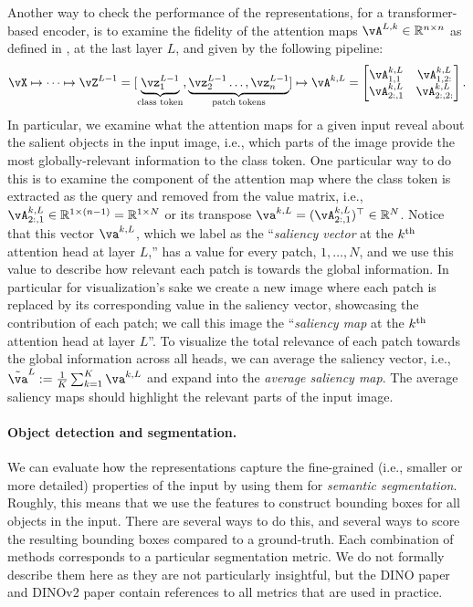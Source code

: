 \documentclass[../../book-main.tex]{subfiles}
\begin{document}
Another way to check the performance of the representations, for a transformer-based encoder, is to examine the fidelity of the attention maps \(\vA^{L, k} \in \R^{n \times n}\) as defined in , at the last layer \(L\), and given by the following pipeline:
\begin{align}
    \vX \mapsto \cdots \mapsto \vZ^{L - 1} = [\underbrace{\vz_{1}^{L - 1}}_{\text{class token}}, \underbrace{\vz_{2}^{L - 1} \dots, \vz_{n}^{L - 1}}_{\text{patch tokens}}] \mapsto \vA^{k, L} = \mat{\vA_{1, 1}^{k, L} & \vA_{1, 2:}^{k, L} \\ \vA_{2:, 1}^{k, L} & \vA_{2:, 2:}^{k, L}}.
\end{align}
In particular, we examine what the attention maps for a given input reveal about the salient objects in the input image, i.e., which parts of the image provide the most globally-relevant information to the class token. One particular way to do this is to examine the component of the attention map where the class token is extracted as the query and removed from the value matrix, i.e., \(\vA_{2:, 1}^{k, L} \in \R^{1 \times (n - 1)} = \R^{1 \times N}\) or its transpose \(\va^{k, L} = (\vA_{2:, 1}^{k, L})^{\top} \in \R^{N}\). Notice that this vector \(\va^{k, L}\), which we label as the ``\textit{saliency vector} at the \(k^{\textnormal{th}}\) attention head at layer \(L\),'' has a value for every patch, \(1, \dots, N\), and we use this value to describe how relevant each patch is towards the global information. In particular for visualization's sake we create a new image where each patch is replaced by its corresponding value in the saliency vector, showcasing the contribution of each patch; we call this image the ``\textit{saliency map} at the \(k^{\textnormal{th}}\) attention head at layer \(L\)''. To visualize the total relevance of each patch towards the global information across all heads, we can average the saliency vector, i.e., \(\tilde{\va}^{L} := \frac{1}{K}\sum_{k = 1}^{K}\va^{k, L}\) and expand into the \textit{average saliency map}. The average saliency maps should highlight the relevant parts of the input image.


\paragraph{Object detection and segmentation.}

We can evaluate how the representations capture the fine-grained (i.e., smaller or more detailed) properties of the input by using them for \textit{semantic segmentation}. Roughly, this means that we use the features to construct bounding boxes for all objects in the input. There are several ways to do this, and several ways to score the resulting bounding boxes compared to a ground-truth. Each combination of methods corresponds to a particular segmentation metric. We do not formally describe them here as they are not particularly insightful, but the DINO paper \citep{caron2021emerging} and DINOv2 paper \citep{oquab2023dinov2} contain references to all metrics that are used in practice.
\end{document}
